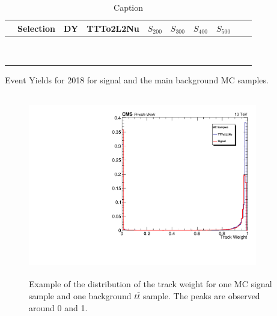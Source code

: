 \documentclass{cernatlasnote}
\begin{document}
\begin{table}
    \centering
    \begin{tabular}{ |c|c|c|c|c|c|c|c|c|c|}
    \hline
         & Selection & DY & TTTo2L2Nu & $S_{200}$ & $S_{300}$ & $S_{400}$ & $S_{500}$ \\
         \hline
         &  &  &  &  &  &  &   \\
         \hline
         &  &  &  &  &  &  &   \\
         \hline
         &  &  &  &  &  &  &  \\
         \hline
         &  &  &  &  &  &  &  \\
         \hline
         &  &  &  &  &  &  &  \\
         \hline
         &  &  &  &  &  &  &  \\
         \hline
         &  &  &  &  &  &  &   \\
         \hline
         &  &  &  &  &  &  &   \\
         \hline
         &  &  &  &  &  &  &   \\
    \hline
    \end{tabular}
    \caption{Caption}
    \label{tab:EVTYIELS2018} Event Yields for 2018 for signal and the main background MC samples.
\end{table}



\begin{figure}[ht]
\centering
\includegraphics[height=8cm, width=10cm, trim= 0cm 0cm 0cm 0cm,clip]{images/VTXEff/TrackWeightCompare.pdf}
\caption{\label{fig:ITW} Example of the distribution of the track weight for one MC signal sample and one background $t\bar{t}$ sample. The peaks are observed around 0 and 1.}
\end{figure} 
\end{document}
